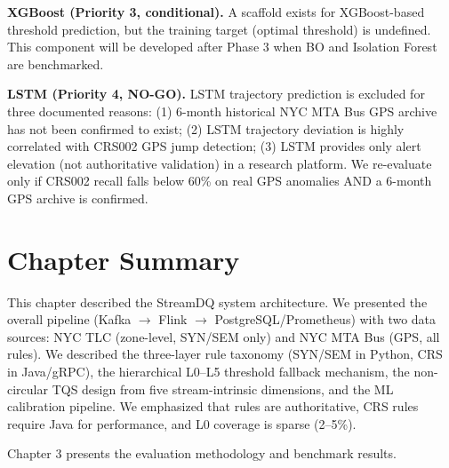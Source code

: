 \textbf{XGBoost (Priority 3, conditional).} A scaffold exists for
XGBoost-based threshold prediction, but the training target (optimal
threshold) is undefined. This component will be developed after Phase 3
when BO and Isolation Forest are benchmarked.

\textbf{LSTM (Priority 4, NO-GO).} LSTM trajectory prediction is excluded
for three documented reasons: (1) 6-month historical NYC MTA Bus GPS
archive has not been confirmed to exist; (2) LSTM trajectory deviation
is highly correlated with CRS002 GPS jump detection; (3) LSTM provides
only alert elevation (not authoritative validation) in a research platform.
We re-evaluate only if CRS002 recall falls below 60\% on real GPS anomalies
AND a 6-month GPS archive is confirmed.

\section{Chapter Summary}
\label{sec:ch2-summary}

This chapter described the StreamDQ system architecture. We presented the
overall pipeline (Kafka $\rightarrow$ Flink $\rightarrow$ PostgreSQL/Prometheus)
with two data sources: NYC TLC (zone-level, SYN/SEM only) and NYC MTA Bus
(GPS, all rules). We described the three-layer rule taxonomy (SYN/SEM in
Python, CRS in Java/gRPC), the hierarchical L0--L5 threshold fallback
mechanism, the non-circular TQS design from five stream-intrinsic dimensions,
and the ML calibration pipeline. We emphasized that rules are authoritative,
CRS rules require Java for performance, and L0 coverage is sparse (2--5\%).

Chapter 3 presents the evaluation methodology and benchmark results.
